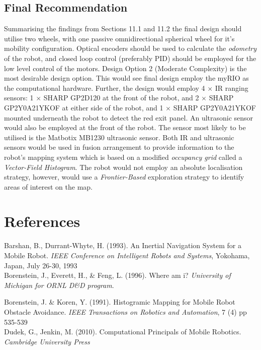 \documentclass[a4paper]{article}
\begin{document}
\subsection{Final Recommendation}
Summarising the findings from Sections 11.1 and 11.2 the final design should utilise two wheels, with one passive omnidirectional spherical wheel for it's mobility configuration. Optical encoders should be used to calculate the \textit{odometry} of the robot, and closed loop control (preferably PID) should be employed for the low level control of the motors. Design Option 2 (Moderate Complexity) is the most desirable design option. This would see final design employ the myRIO as the computational hardware. Further, the design would employ 4 $\times$ IR ranging sensors: 1 $\times$ SHARP GP2D120 at the front of the robot, and 2 $\times$ SHARP GP2Y0A21YKOF at either side of the robot, and 1 $\times$ SHARP GP2Y0A21YKOF mounted underneath the robot to detect the red exit panel. An ultrasonic sensor would also be employed at the front of the robot. The sensor most likely to be utilised is the Matbotix MB1230 ultrasonic sensor. Both IR and ultrasonic sensors would be used in fusion arrangement to provide information to the robot's mapping system which is based on a modified \textit{occupancy grid} called a \textit{Vector-Field Histogram}. The robot would not employ an absolute localisation strategy, however, would use a \textit{Frontier-Based} exploration strategy to identify areas of interest on the map.
\clearpage

\section{References}
Barshan, B., Durrant-Whyte, H. (1993). An Inertial Navigation System for a Mobile Robot. \textit{IEEE Conference on Intelligent Robots and Systems}, Yokohama, Japan, July 26-30, 1993\\

Borenstein, J., Everett, H., \& Feng, L. (1996). Where am i? \textit{University of Michigan for ORNL D\&D program}.

Borenstein, J. \& Koren, Y. (1991). Histogramic Mapping for Mobile Robot Obstacle Avoidance. \textit{IEEE Transactions on Robotics and Automation}, 7 (4) pp 535-539\\

Dudek, G., Jenkin, M. (2010). Computational Principals of Mobile Robotics. \textit{Cambridge University Press}\\
\end{document}
